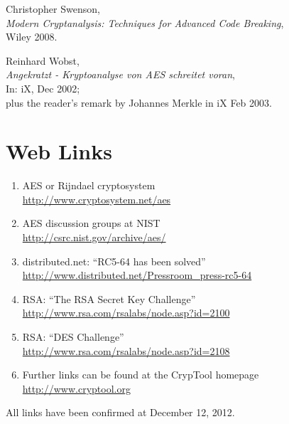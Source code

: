 \begin{thebibliography}{99999}
  
       Christopher Swenson, \\
       {\em Modern Cryptanalysis: Techniques for Advanced Code Breaking}, \\
       Wiley 2008.

  
       Reinhard Wobst, \\
       {\em Angekratzt - Kryptoanalyse von AES schreitet voran}, \\
       In: iX, Dec 2002; \\
       plus the reader's remark by Johannes Merkle in iX Feb 2003.

\end{thebibliography}



\newpage
\chapter*{Web Links}

\begin{enumerate}

  \hypertarget{CM_HT_Weblink_Rijndael-Cryptosystem}{}
  \item AES or Rijndael cryptosystem \\
        \url{http://www.cryptosystem.net/aes}

  \item AES discussion groups at NIST \\
	\url{http://csrc.nist.gov/archive/aes/}

  \item distributed.net: ``RC5-64 has been solved'' \\
        \url{http://www.distributed.net/Pressroom_press-rc5-64}

  \item RSA: ``The RSA Secret Key Challenge'' \\
        \url{http://www.rsa.com/rsalabs/node.asp?id=2100}

  \item RSA: ``DES Challenge'' \\
        \url{http://www.rsa.com/rsalabs/node.asp?id=2108}

  \item Further links can be found at the CrypTool homepage \\
        \url{http://www.cryptool.org}
	       
\end{enumerate}

All links have been confirmed at December 12, 2012.



